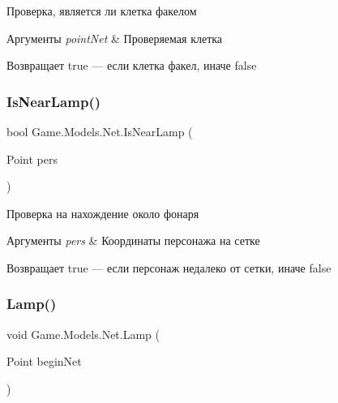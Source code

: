 Проверка, является ли клетка факелом 


\begin{DoxyParams}{Аргументы}
{\em point\+Net} & Проверяемая клетка\\
\hline
\end{DoxyParams}
\begin{DoxyReturn}{Возвращает}
true — если клетка факел, иначе false
\end{DoxyReturn}
\mbox{\label{class_game_1_1_models_1_1_net_aca9587ab3eac33b7f6b86cbe5148b870}} 
\subsubsection{\texorpdfstring{Is\+Near\+Lamp()}{IsNearLamp()}}
{\footnotesize\ttfamily bool Game.\+Models.\+Net.\+Is\+Near\+Lamp (\begin{DoxyParamCaption}\item[{Point}]{pers }\end{DoxyParamCaption})}



Проверка на нахождение около фонаря 


\begin{DoxyParams}{Аргументы}
{\em pers} & Координаты персонажа на сетке\\
\hline
\end{DoxyParams}
\begin{DoxyReturn}{Возвращает}
true — если персонаж недалеко от сетки, иначе false
\end{DoxyReturn}
\mbox{\label{class_game_1_1_models_1_1_net_adad1b194504159a34c614c976abfd644}} 
\subsubsection{\texorpdfstring{Lamp()}{Lamp()}}
{\footnotesize\ttfamily void Game.\+Models.\+Net.\+Lamp (\begin{DoxyParamCaption}\item[{Point}]{begin\+Net }\end{DoxyParamCaption})}



